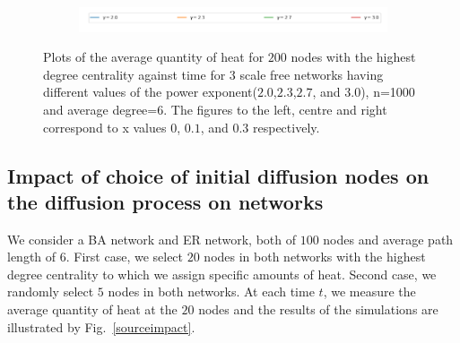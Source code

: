 \documentclass[10pt,a4paper]{article}
\theoremstyle{plain}
\theoremstyle{definition}
\begin{document}
\begin{figure}[H]
\begin{subfigure}[b]{0.35\textwidth}
     	\end{subfigure}\\
     	\begin{subfigure}[b]{0.80\textwidth}
     		\includegraphics[width= \textwidth]{images/legend-gamma.png}
     	\end{subfigure}
     	\caption{Plots of the average quantity of heat for $200$ nodes with the highest degree centrality against time for $3$ scale free networks having different values of the power exponent($2.0$,$2.3$,$2.7$, and $3.0$), n=1000 and average degree=$6$. The figures to the left, centre and right correspond to x values $0$, $0.1$, and $0.3$ respectively.}
     	\label{quantity-exponents}
     \end{figure}
 
     \subsection{Impact of choice of initial diffusion nodes on the diffusion process on networks}
     We consider a BA network and ER network, both of $100$ nodes and average path length of $6$. First case, we select $20$ nodes in both networks with the highest degree centrality to which we assign specific amounts of heat. Second case, we randomly select $5$ nodes in both networks. At each time $t$, we measure the average quantity of heat at the $20$ nodes and the results of the simulations are illustrated by Fig.~\ref{sourceimpact}.
     
\end{document}
